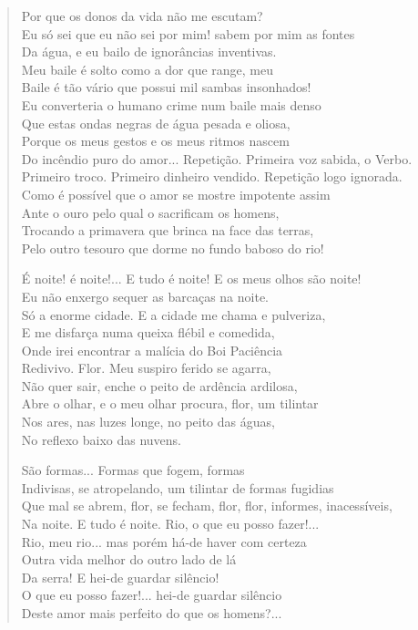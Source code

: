 \begin{verse}
Por que os donos da vida não me escutam?\\
Eu só sei que eu não sei por mim! sabem por mim as fontes\\
Da água, e eu bailo de ignorâncias inventivas.\\
Meu baile é solto como a dor que range, meu\\
Baile é tão vário que possui mil sambas insonhados!\\
Eu converteria o humano crime num baile mais denso\\
Que estas ondas negras de água pesada e oliosa,\\
Porque os meus gestos e os meus ritmos nascem\\
Do incêndio puro do amor... Repetição. Primeira voz sabida, o Verbo.\\
Primeiro troco. Primeiro dinheiro vendido. Repetição logo ignorada.\\
Como é possível que o amor se mostre impotente assim\\
Ante o ouro pelo qual o sacrificam os homens,\\
Trocando a primavera que brinca na face das terras,\\
Pelo outro tesouro que dorme no fundo baboso do rio!

É noite! é noite!... E tudo é noite! E os meus olhos são noite!\\
Eu não enxergo sequer as barcaças na noite.\\
Só a enorme cidade. E a cidade me chama e pulveriza,\\
E me disfarça numa queixa flébil e comedida,\\
Onde irei encontrar a malícia do Boi Paciência\\
Redivivo. Flor. Meu suspiro ferido se agarra,\\
Não quer sair, enche o peito de ardência ardilosa,\\
Abre o olhar, e o meu olhar procura, flor, um tilintar\\
Nos ares, nas luzes longe, no peito das águas,\\
No reflexo baixo das nuvens.

São formas... Formas que fogem, formas\\
Indivisas, se atropelando, um tilintar de formas fugidias\\
Que mal se abrem, flor, se fecham, flor, flor, informes, inacessíveis,\\
Na noite. E tudo é noite. Rio, o que eu posso fazer!...\\
Rio, meu rio... mas porém há-de haver com certeza\\
Outra vida melhor do outro lado de lá\\
Da serra! E hei-de guardar silêncio!\\
O que eu posso fazer!... hei-de guardar silêncio\\
Deste amor mais perfeito do que os homens?...


\end{verse}
